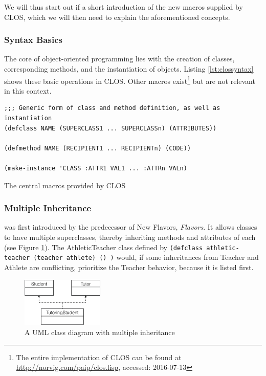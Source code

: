\documentclass[oribibl]{llncs}
\begin{document}
We will thus start out if a short introduction of the new macros supplied by CLOS, which we will then need to explain the aforementioned concepts.


\subsubsection{Syntax Basics}
The core of object-oriented programming lies with the creation of classes, corresponding methods, and the instantiation of objects. Listing \ref{lst:clossyntax} shows these basic operations in CLOS. Other macros exist\footnote{The entire implementation of CLOS can be found at \url{http://norvig.com/paip/clos.lisp}, accessed: 2016-07-13} but are not relevant in this context.

\begin{listing}[]%
\begin{verbatim}
;;; Generic form of class and method definition, as well as instantiation
(defclass NAME (SUPERCLASS1 ... SUPERCLASSn) (ATTRIBUTES))

(defmethod NAME (RECIPIENT1 ... RECIPIENTn) (CODE))

(make-instance 'CLASS :ATTR1 VAL1 ... :ATTRn VALn)
\end{verbatim}
\caption{The central macros provided by CLOS}
\label{lst:clossyntax}
\end{listing}


\subsubsection{Multiple Inheritance}
\label{sec:mulinh}
was first introduced by the predecessor of New Flavors, \emph{Flavors}. It allows classes to have multiple superclasses, thereby inheriting methods and attributes of each (see Figure \ref{fig:multipleinheritance}). The AthleticTeacher class defined by \texttt{(defclass athletic-teacher (teacher athlete) () )} would, if some inheritances from Teacher and Athlete are conflicting, prioritize the Teacher behavior, because it is listed first.  

\begin{figure}[]
    \centering
    \includegraphics[width=0.35\textwidth]{images/multipleinheritance2.png}
    \caption{A UML class diagram with multiple inheritance}
    \label{fig:multipleinheritance}
\end{figure}
\end{document}
